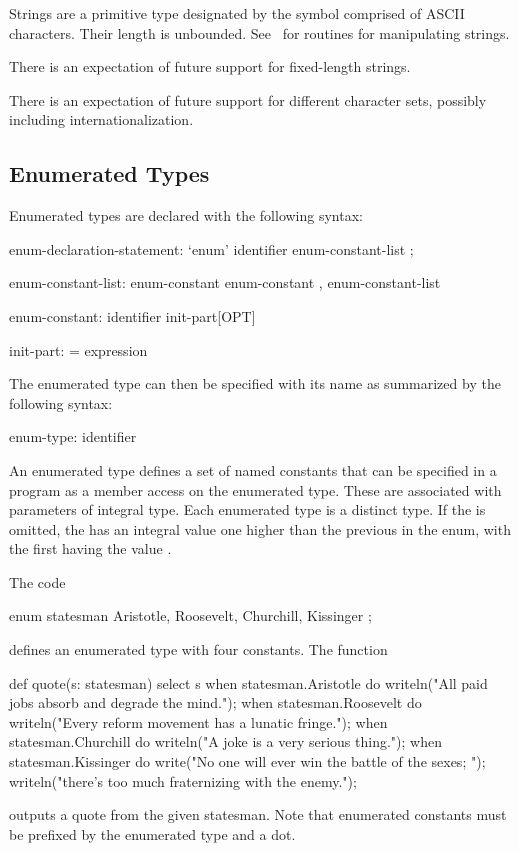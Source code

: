 Strings are a primitive type designated by the symbol 
comprised of ASCII characters.  Their length is unbounded.
See~ for routines for manipulating strings.


\begin{openissue}
There is an expectation of future support for fixed-length strings.
\end{openissue}

\begin{openissue}
There is an expectation of future support for different character
sets, possibly including internationalization.
\end{openissue}

\subsection{Enumerated Types}
\label{Enumerated_Types}

Enumerated types are declared with the following syntax:
\begin{syntax}
enum-declaration-statement:
  `enum' identifier { enum-constant-list } ;

enum-constant-list:
  enum-constant
  enum-constant , enum-constant-list

enum-constant:
  identifier init-part[OPT]

init-part:
  = expression
\end{syntax}

The enumerated type can then be specified with its name as summarized
by the following syntax:
\begin{syntax}
enum-type:
  identifier
\end{syntax}

An enumerated type defines a set of named constants that can be
specified in a program as a member access on the enumerated type.
These are associated with parameters of integral type.  Each
enumerated type is a distinct type. If the  is
omitted, the  has an integral value one higher
than the previous  in the enum, with the first
having the value .

\begin{example}
The code
\begin{chapel}
enum statesman { Aristotle, Roosevelt, Churchill, Kissinger } ;
\end{chapel}
defines an enumerated type with four constants.  The function
\begin{chapel}
def quote(s: statesman) {
  select s {
    when statesman.Aristotle do
       writeln("All paid jobs absorb and degrade the mind.");
    when statesman.Roosevelt do
       writeln("Every reform movement has a lunatic fringe.");
    when statesman.Churchill do
       writeln("A joke is a very serious thing.");
    when statesman.Kissinger do
       { write("No one will ever win the battle of the sexes; ");
         writeln("there's too much fraternizing with the enemy."); }
  }
}
\end{chapel}
outputs a quote from the given statesman.  Note that enumerated
constants must be prefixed by the enumerated type and a dot.
\end{example}

